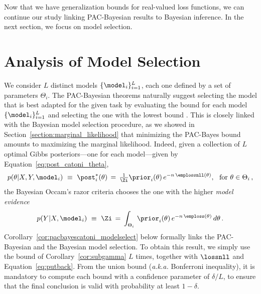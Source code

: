 \documentclass{article}
\theoremstyle{definition}
\theoremstyle{plain}
\begin{document}
Now that we have generalization bounds for real-valued loss functions, we can continue our study linking PAC-Bayesian results to Bayesian inference. 
In the next section, we focus on model selection.


\section{Analysis of Model Selection}

\label{sec:bayesian_model_comp}

We consider $L$ distinct models $\{\model_i\}_{i=1}^L$, each one defined by a set of parameters $\Theta_i$.
The PAC-Bayesian theorems naturally suggest selecting the model that is best adapted for the given task  by evaluating the bound for each model $\{\model_i\}_{i=1}^L$ and selecting the one with the lowest bound \citep{ambroladze-06,mcallester-03a,zhang-06}. 
This is closely linked with the Bayesian model selection procedure, as we showed in Section~\ref{section:marginal_likelihood} that minimizing the PAC-Bayes bound amounts to maximizing the marginal likelihood. %
Indeed, given a collection of $L$ optimal Gibbs posteriors---one for each model---given by Equation~\eqref{eq:post_catoni_theta},
\begin{equation} \label{eq:optpost_modelselect}
p(\theta|X,Y, \model_i) \ \equiv\  \post_i^*(\theta) \, = \, \tfrac1{\Zi} \prior_i(\theta) \,e^{-n\,\emplossnll(\theta)}, \ \mbox{ for } \theta \in \Theta_i\,,
\end{equation}
%
%
%
the Bayesian Occam's razor criteria  \citep{jeffreys-92,mackay-92}  chooses the one with the higher \emph{model evidence}
\begin{equation} \label{eq:model_evidence}
p(Y|X,\model_i) \ \equiv \ \Zi \,=\, 
\int_{\Theta_i} \, \prior_i(\theta)\, e^{-n \,\emploss(\theta)} \, d \theta\,.
\end{equation}
Corollary~\ref{cor:pacbayescatoni_modelselect} below formally links the PAC-Bayesian and the Bayesian model selection.
To obtain this result, we simply use the bound of Corollary~\ref{cor:subgamma} $L$ times, together with $\lossnll$ and Equation~\eqref{eq:putback}.
From the union bound (\emph{a.k.a.} Bonferroni inequality), it is mandatory to compute each bound with a confidence parameter of
$\delta/L$,
to ensure that the final conclusion is valid with probability at least $1{-}\delta$.
%
%
%
\end{document}
